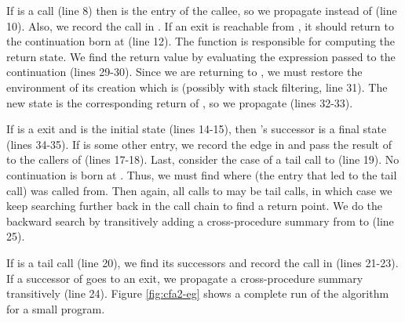 \documentclass{LMCS}
\theoremstyle{definition} \newtheorem{property}[thm]{Property}
\begin{document}
If \lstatw{} is a call (line 8) then \lstath{} is the entry of the callee,
so we propagate  instead of  (line 10).
Also, we record the call in \callers.
If an exit \lstatf{} is reachable from \lstath, it should return
to the continuation born at \lstatw{} (line 12).
The function  is responsible for computing the return state.
We find the return value \auarg{} by evaluating the expression  passed to
the continuation (lines 29-30).
Since we are returning to , we must restore the environment of 
its creation which is  (possibly with stack filtering, line 31).
The new state \lstat{} is the corresponding return of \lstatw{},
so we propagate  (lines 32-33).

If \lstatw{} is a \dlceval{} exit and \lstato{} is the initial state (lines 
14-15), then \lstatw{}'s successor is a final state (lines 34-35).
If \lstato{} is some other entry, we record the edge in \summary{} and pass the
re\-sult of \lstatw{} to the callers of \lstato{} (lines 17-18).
Last, consider the case of a tail call \lstatf{} to \lstato{} (line 19).
No continuation is born at \lstatf.
Thus, we must find where \lstath{} (the entry that led to the tail call) was 
called from.
Then again, all calls to \lstath{} may be tail calls, in which case we keep 
searching further back in the call chain to find a return point.
We do the backward search by transitively adding a cross-procedure summary from
\lstath{} to \lstatw{} (line 25).

If \lstatw{} is a tail call (line 20), we find its successors and record the 
call in \tcallers{} (lines 21-23).
If a successor of \lstatw{} goes to an exit, we propagate a cross-procedure
summary transitively (line 24).
Figure \ref{fig:cfa2-eg} shows a complete run of the algorithm for a small 
program.
\end{document}
